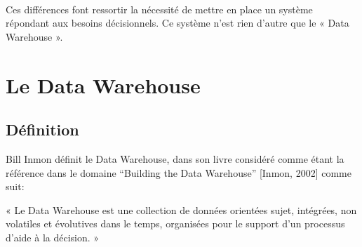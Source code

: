 \paragraph{}
	Ces différences font ressortir la nécessité de mettre en place un système répondant aux besoins décisionnels. Ce système n’est rien d’autre que le « Data Warehouse ».


\section{Le Data Warehouse}
 \subsection{Définition}
 Bill Inmon définit le Data Warehouse, dans son livre considéré comme étant la référence dans le domaine ``Building the Data Warehouse'' [Inmon, 2002] comme suit:
 
« Le Data Warehouse est une collection de données orientées sujet, intégrées, non volatiles et évolutives dans le temps, organisées pour le support d’un processus d’aide à la décision. »

